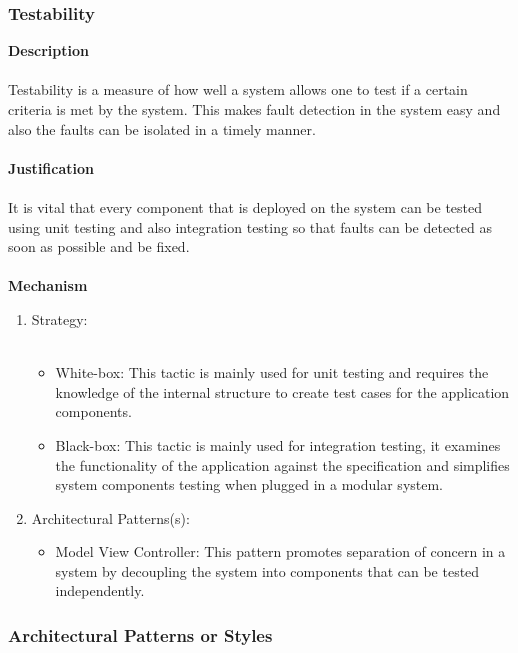 			\subsubsection*{Testability}
			\textbf{Description}\\\\
			Testability is a measure of how well a system allows one to test if a certain criteria is met by the system. This makes fault detection in the system easy and also the faults can be isolated in a timely manner.\\\\
			\textbf{Justification}\\\\
			It is vital that every component that is deployed on the system can be tested using unit testing and also integration testing so that faults can be detected as soon as possible and be fixed. \\\\
			\textbf{Mechanism}
			\begin{enumerate}
				\item Strategy:\\\\
				\begin{itemize}
				\item White-box: This tactic is mainly used for unit testing and requires the knowledge of the internal structure to create test cases for the application components.
				\item Black-box: This tactic is mainly used for integration testing, it examines the functionality of the application against the specification and simplifies system components testing when plugged in a modular system.
				\end{itemize}
				\item Architectural Patterns(s):
				\begin{itemize}
				\item Model View Controller: This pattern promotes separation of concern in a system by decoupling the system into components that can be tested independently.   
				\end{itemize}
			\end{enumerate}	
    \newpage
    \subsubsection{Architectural Patterns or Styles}
